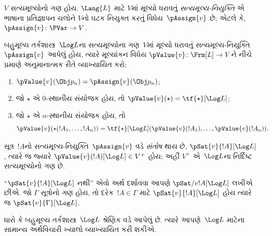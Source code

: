 
\label{guunit:OLP-0389}


\begin{defn}[સત્યમૂલ્ય-નિયુક્તિઓ]
$V$ સત્યમૂલ્યોનો ગણ હોય. $\Lang{L}$ માટે $V$માં મૂલ્યો ધરાવતું
\emph{સત્યમૂલ્ય-નિયુક્તિ} એ ભાષાના પ્રતિજ્ઞાપન ચલોને $V$નો
ઘટક નિયુક્ત કરતું વિધેય~$\pAssign{v}$ છે; એટલે કે,
$\pAssign{v} \colon \PVar \to V$.
\end{defn}

\begin{defn}
બહુમૂલ્ય તર્કશાસ્ત્ર~$\Log L$ના સત્યમૂલ્યોના ગણ~$V$માં મૂલ્યો
ધરાવતું સત્યમૂલ્ય-નિયુક્તિ~$\pAssign{v}$ આપેલું હોય, ત્યારે મૂલ્યાંકન
વિધેય $\pValue{v} \colon \Frm[L] \to V$ને નીચે પ્રમાણે અનુમાનાત્મક
રીતે વ્યાખ્યાયિત કરો:
  \begin{enumerate}
    \item $\pValue{v}(\Obj p_n) = \pAssign{v}(\Obj p_n)$;
    \item જો $\star$ એ $0$-સ્થાનીય સંયોજક હોય, તો $\pValue{v}(\star)  = \tf{\star}[\Log L]$;
    \item જો $\star$ એ $n$-સ્થાનીય સંયોજક હોય, તો
    \[
      \pValue{v}(\star(!A_1, \dots, !A_n)) = \tf{\star}[\Log L]
      (\pValue{v}(!A_1), \dots, \pValue{v}(!A_n)).
    \]
  \end{enumerate}
\end{defn}

\begin{defn}[સંતોષ]
 સૂત્ર~$!A$નો સત્યમૂલ્ય-નિયુક્તિ~$\pAssign{v}$
વડે \emph{સંતોષ} થાય છે, $\pSat{v}{!A}[\Log L]$, ત્યારે જ જ્યારે
$\pValue{v}(!A)[\Log L] \in V^+$ હોય; અહીં $V^+$ એ~$\Log L$ના
નિર્દિષ્ટ સત્યમૂલ્યોનો ગણ છે.

``$\pSat{v}{!A}[\Log L]$ નથી'' એવો અર્થ દર્શાવવા આપણે
$\pSat/{v}{!A}[\Log L]$ લખીએ છીએ. જો $\Gamma$ સૂત્રોનો ગણ હોય, તો
દરેક~$!A \in \Gamma$ માટે $\pSat{v}{!A}[\Log L]$ હોય ત્યારે જ
$\pSat{v}{\Gamma}[\Log L]$.
\end{defn}
\endgroup


\begingroup
\makeatletter{}\makeatother


\label{guunit:OLP-0390}


ધારો કે બહુમૂલ્ય તર્કશાસ્ત્ર~$\Log L$ શ્રેણિક વડે આપેલું છે. ત્યારે
આપણે~$\Log L$ માટેના સામાન્ય અર્થવિચારી ખ્યાલો વ્યાખ્યાયિત કરી શકીએ.


